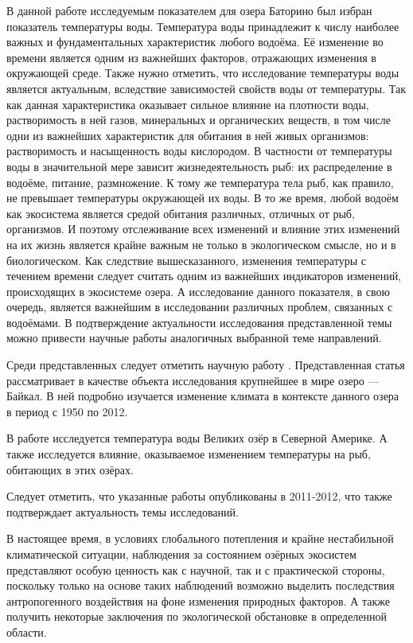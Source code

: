 В данной работе исследуемым показателем для озера Баторино был избран показатель температуры воды. Температура воды принадлежит к числу наиболее важных и фундаментальных характеристик любого водоёма. Её изменение во времени является одним из важнейших факторов, отражающих изменения в окружающей среде. Также нужно отметить, что исследование температуры воды является актуальным, вследствие зависимостей свойств воды от температуры. Так как данная характеристика оказывает сильное влияние на плотности воды, растворимость в ней газов, минеральных и органических веществ, в том числе одни из важнейших характеристик для обитания в ней живых организмов: растворимость и насыщенность воды кислородом. В частности от температуры воды в значительной мере зависит жизнедеятельность рыб: их распределение в водоёме, питание, размножение. К тому же температура тела рыб, как правило, не превышает температуры окружающей их воды. В то же время, любой водоём как экосистема является средой обитания различных, отличных от рыб, организмов. И поэтому отслеживание всех изменений и влияние этих изменений на их жизнь является крайне важным не только в экологическом смысле, но и в биологическом. Как следствие вышесказанного, изменения температуры с течением времени следует считать одним из важнейших индикаторов изменений, происходящих в экосистеме озера. А исследование данного показателя, в свою очередь, является важнейшим в исследовании различных проблем, связанных с водоёмами. В подтверждение актуальности исследования представленной темы можно привести научные работы \cite{Katz2011,OBrien2012a,Subehi2011} аналогичных выбранной теме направлений.

Среди представленных следует отметить научную работу \cite{Katz2011}. Представленная статья рассматривает в качестве объекта исследования крупнейшее в мире озеро --- Байкал. В ней подробно изучается изменение климата в контексте данного озера в период с 1950 по 2012.

В работе \cite{OBrien2012a} исследуется температура воды Великих озёр в Северной Америке. А также исследуется влияние, оказываемое изменением температуры на рыб, обитающих в этих озёрах.

Следует отметить, что указанные работы опубликованы в 2011-2012, что также подтверждает актуальность темы исследований.

В настоящее время, в условиях глобального потепления и крайне нестабильной климатической ситуации, наблюдения за состоянием озёрных экосистем представляют особую ценность как с научной, так и с практической стороны, поскольку только на основе таких наблюдений возможно выделить последствия антропогенного воздействия на фоне изменения природных факторов. А также получить некоторые заключения по экологической обстановке в определенной области.

